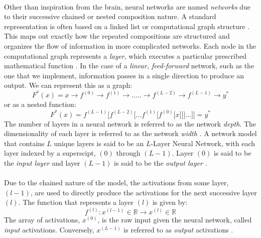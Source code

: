 \documentclass[12pt,letterpaper]{article}
\begin{document}
\paragraph*{}Other than inspiration from the brain, neural networks are named \textit{networks} due to their successive chained or nested composition nature. A standard representation is often based on a linked list or computational graph structure \cite{Goodfellow}. This maps out exactly how the repeated compositions are structured and organizes the flow of information in more complicated networks. Each node in the computational graph represents a \textit{layer}, which executes a particular prescribed mathematical function \cite{Goodfellow}. In the case of a \textit{linear, feed-forward} network, such as the one that we implement, information passes in a single direction to produce an output. We can represent this as a graph:
\begin{equation}
\label{eqn-FunctionGraph}
F^*(x) = x \rightarrow f^{(0)} \rightarrow f^{(1)} \rightarrow ..... \rightarrow
f^{(L-2)} \rightarrow f^{(L-1)} \rightarrow y^*
\end{equation}
or as a nested function:
\begin{equation}
\label{eqn-FunctionChain}
F^*(x) = f^{(L-1)}\big[f^{(L-2)}\big[...f^{(1)}\big[f^{(0)}\big[x\big]\big]\big]...\big]\big] = y^*
\end{equation}
The number of layers in a neural network is referred to as the network \textit{depth}. The dimensionality of each layer is referred to as the network \textit{width} \cite{Geron,Loy}.
A network model that contains $L$ unique layers is said to be an $L$-Layer Neural Network, with each layer indexed by a superscipt, $(0)$ through $(L-1)$. Layer $(0)$ is said to be the \textit{input layer} and layer $(L-1)$ is said to be the \textit{output layer} \cite{Geron,Loy}. 

\paragraph*{}Due to the chained nature of the model, the activations from some layer, $(l-1)$, are used to directly produce the activations for the next successive layer $(l)$. The function that represents a layer $(l)$ is given by:
\begin{equation}
\label{eqn-altLayerFunction}
f^{(l)} : x^{(l-1)} \in \mathbb{R} \rightarrow x^{(l)} \in \mathbb{R}
\end{equation}
The array of activations, $x^{(0)}$, is the raw input given the neural network, called \textit{input} activations. Conversely, $x^{(L-1)}$ is referred to as \textit{output} activations \cite{Geron,James,Loy}.
\end{document}
